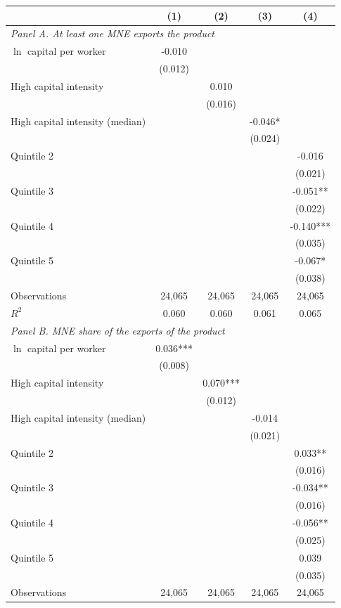\begin{tabular}{l*{4}{c}}
\toprule
 & (1) & (2) & (3) & (4) \\
\midrule
\multicolumn{5}{l}{\textit{Panel A. At least one MNE exports the product}} \\
$\ln$ capital per worker & -0.010 &  &  &  \\
 & (0.012) &  &  &  \\
High capital intensity &  & 0.010 &  &  \\
 &  & (0.016) &  &  \\
High capital intensity (median) &  &  & -0.046* &  \\
 &  &  & (0.024) &  \\
Quintile 2 &  &  &  & -0.016 \\
 &  &  &  & (0.021) \\
Quintile 3 &  &  &  & -0.051** \\
 &  &  &  & (0.022) \\
Quintile 4 &  &  &  & -0.140*** \\
 &  &  &  & (0.035) \\
Quintile 5 &  &  &  & -0.067* \\
 &  &  &  & (0.038) \\
Observations & 24,065 & 24,065 & 24,065 & 24,065 \\
$R^2$ & 0.060 & 0.060 & 0.061 & 0.065 \\
\midrule
\multicolumn{5}{l}{\textit{Panel B. MNE share of the exports of the product}} \\
$\ln$ capital per worker & 0.036*** &  &  &  \\
 & (0.008) &  &  &  \\
High capital intensity &  & 0.070*** &  &  \\
 &  & (0.012) &  &  \\
High capital intensity (median) &  &  & -0.014 &  \\
 &  &  & (0.021) &  \\
Quintile 2 &  &  &  & 0.033** \\
 &  &  &  & (0.016) \\
Quintile 3 &  &  &  & -0.034** \\
 &  &  &  & (0.016) \\
Quintile 4 &  &  &  & -0.056** \\
 &  &  &  & (0.025) \\
Quintile 5 &  &  &  & 0.039 \\
 &  &  &  & (0.035) \\
Observations & 24,065 & 24,065 & 24,065 & 24,065 \\

\end{tabular}
